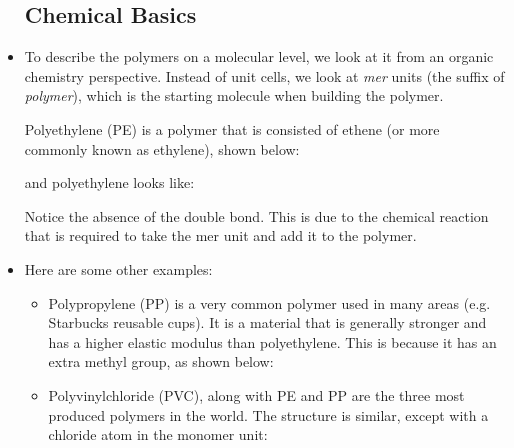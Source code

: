 \begin{itemize}
    \subsection{Chemical Basics}
    \item To describe the polymers on a molecular level, we look at it from an organic chemistry perspective. Instead of unit cells, we look at \textit{mer} units (the suffix of \textit{polymer}), which is the starting molecule when building the polymer.
    \begin{case}
        Polyethylene (PE) is a polymer that is consisted of ethene (or more commonly known as ethylene), shown below:
        \begin{center}
        \end{center}
        and polyethylene looks like:
        \begin{center}
        \end{center}
        \vspace{2mm} %
        Notice the absence of the double bond. This is due to the chemical reaction that is required to take the mer unit and add it to the polymer.
    \end{case}
    \item Here are some other examples:
    \begin{itemize}
        \item  Polypropylene (PP) is a very common polymer used in many areas (e.g. Starbucks reusable cups). It is a material that is generally stronger and has a higher elastic modulus than polyethylene. This is because it has an extra  methyl group, as shown below:
        \begin{center}
        \end{center}
        \item Polyvinylchloride (PVC), along with PE and PP are the three most produced polymers in the world. The structure is similar, except with a chloride atom in the monomer unit:
        \begin{center}

\end{center}
\end{itemize}
\end{itemize}
